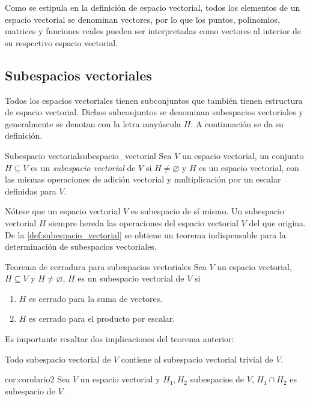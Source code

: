 \documentclass{fmbnotes}
\begin{document}
Como se estipula en la definición de espacio vectorial, todos los elementos de un espacio vectorial se denominan vectores, por lo que los puntos, polinomios, matrices y funciones reales pueden ser interpretadas como vectores al interior de su respectivo espacio vectorial.

\subsection{Subespacios vectoriales}

Todos los espacios vectoriales tienen subconjuntos que también tienen estructura de espacio vectorial. Dichos subconjuntos se denominan subespacios vectoriales y generalmente se denotan con la letra mayúscula \(H\). A continuación se da su definición.

\begin{definicion}{Subespacio vectorial}{subespacio_vectorial}
Sea \(V\) un espacio vectorial, un conjunto \(H \subseteq V\) es un \emph{subespacio vectorial} de \(V\) si \(H \neq \varnothing\) y \(H\) es un espacio vectorial, con las mismas operaciones de adición vectorial y multiplicación por un escalar definidas para \(V\). 
\end{definicion}

Nótese que un espacio vectorial \(V\) es subespacio de sí mismo. Un subespacio vectorial \(H\) siempre hereda las operaciones del espacio vectorial \(V\) del que origina. De la \autoref{def:subespacio_vectorial} se obtiene un teorema indispensable para la determinación de subespacios vectoriales.

\begin{teorema}{Teorema de cerradura para subespacios vectoriales}{}
Sea \(V\) un espacio vectorial, \(H \subseteq V\) y \(H \neq \varnothing\), \(H\) es un subespacio vectorial de \(V\) si
\begin{enumerate}
\item \( H \) es cerrado para la suma de vectores. 
\item \( H \) es cerrado para el producto por escalar.
\end{enumerate}
\end{teorema}
Es importante resaltar dos implicaciones del teorema anterior:

\begin{corolario}{}{}
Todo subespacio vectorial de \(V\) contiene al subespacio vectorial trivial de \(V\). 
\end{corolario} 

\begin{corolario}{}{cor:corolario2}
Sea \(V\) un espacio vectorial y \(H_1, H_2\) subespacios de \(V\), \(H_1 \cap H_2\) es subespacio de \(V\).
\end{corolario}
\end{document}
